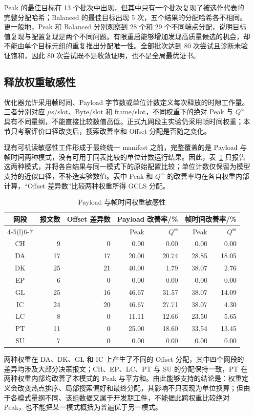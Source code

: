 \documentclass[UTF8,a4paper,twoside,zihao=-4]{ctexart}
\numberwithin{equation}{section}
\numberwithin{figure}{section}
\numberwithin{table}{section}
\theoremstyle{definition}
\numberwithin{algocf}{section}
\begin{document}
Peak 的最佳目标在 13 个批次中出现，但其中只有一个批次复现了被选作代表的完整分配哈希；Balanced 的最佳目标出现 5 次，五个结果的分配哈希各不相同。更一般地，Peak 和 Balanced 分别观察到 28 个和 29 个不同端点分配，说明目标值复现与配置复现是两个不同问题。有限重启能够增加发现高质量候选的机会，却不能由单个目标元组的重复推出分配唯一性。全部批次达到 80 次尝试且诊断未验证饱和，因此 80 次尝试既不是收敛证明，也不是全局最优证书。

\subsection{释放权重敏感性}
\label{subsec:appendix-weight}

优化器允许采用帧时间、Payload 字节数或单位计数定义每次释放的时隙工作量。三者分别对应 $\mu$s/slot、Byte/slot 和 frame/slot，不同权重下的绝对 Peak 与 $Q^{\mathrm{ss}}$ 具有不同量纲，不能直接比较数值高低。正式九网段主实验仍采用帧时间权重；本节只考察评价口径改变后，搜索改善率和 Offset 分配是否随之变化。

现有可机读敏感性工件形成于最终统一 manifest 之前，完整覆盖的是 Payload 与帧时间两种模式，没有可用于同表比较的单位计数运行结果。因此，表~\ref{tab:appendix-weight} 只报告这两种模式，并将各自结果与同一模式下的原始配置比较；单位计数仅保留为模型支持的近似口径，不补造实验数值。表中 Peak 和 $Q^{\mathrm{ss}}$ 的改善率均在各自权重内部计算，“Offset 差异数”比较两种权重所得 GCLS 分配。

\begin{table}[htbp]
\centering
\small
\caption{Payload 与帧时间权重敏感性}
\label{tab:appendix-weight}
\begin{tabular}{@{}crrrrrr@{}}
\toprule
网段 & 报文数 & Offset 差异数 &
\multicolumn{2}{c}{Payload 改善率/\%} &
\multicolumn{2}{c}{帧时间改善率/\%} \\
\cmidrule(lr){4-5}\cmidrule(l){6-7}
 & & & Peak & $Q^{\mathrm{ss}}$ & Peak & $Q^{\mathrm{ss}}$ \\
\midrule
CH & 9  & 0  & 0.00  & 0.00  & 0.00  & 0.00 \\
DA & 17 & 17 & 20.00 & 20.74 & 28.85 & 18.05 \\
DK & 25 & 21 & 40.00 & 1.79  & 38.07 & 2.76 \\
EP & 6  & 0  & 0.00  & 0.00  & 0.00  & 0.00 \\
GL & 25 & 16 & 46.67 & 31.57 & 38.07 & 14.09 \\
IC & 24 & 20 & 46.67 & 27.71 & 38.07 & 4.30 \\
LC & 8  & 0  & 11.11 & 12.66 & 23.50 & 5.65 \\
PT & 11 & 0  & 25.00 & 18.60 & 33.54 & 13.45 \\
SU & 7  & 0  & 0.00  & 0.00  & 0.00  & 0.00 \\
\bottomrule
\end{tabular}
\end{table}

两种权重在 DA、DK、GL 和 IC 上产生了不同的 Offset 分配，其中四个网段的差异均涉及大部分决策报文；CH、EP、LC、PT 与 SU 的分配保持一致，PT 在两种权重内部均改善了本模式的 Peak 与平方和。由此能够支持的结论是：权重定义会改变热点排序、局部搜索偏好和最终分配，其影响不只表现为单位换算；但由于各模式量纲不同、该组数据又属于开发期工件，不能据此跨权重比较绝对 Peak，也不能把某一模式概括为普遍优于另一模式。
\end{document}
